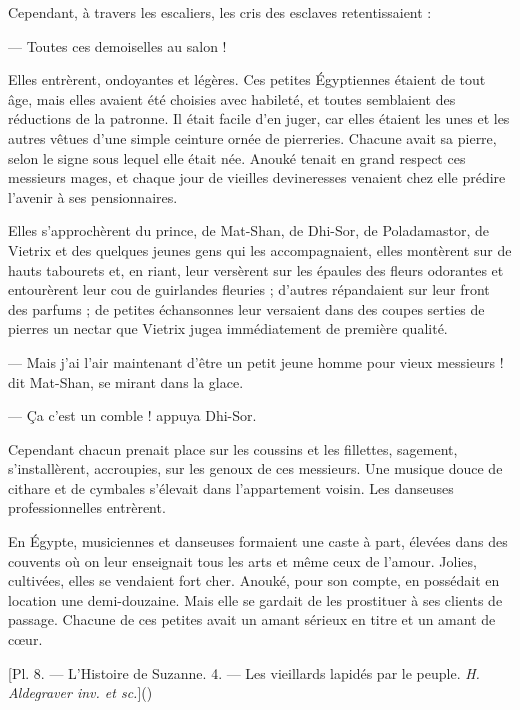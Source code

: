 \documentclass[a4paper, 11pt, oneside, polutonikogreek, french]{article}
\begin{document}
\bigskip
\centerline{\EightStarTaper}
\centerline{\EightStarTaper\EightStarTaper}
\bigskip

Cependant, à travers les escaliers, les cris des esclaves retentissaient :

--- Toutes ces demoiselles au salon !

Elles entrèrent, ondoyantes et légères. Ces petites Égyptiennes étaient de tout âge, mais elles avaient été choisies avec habileté, et toutes semblaient des réductions de la patronne. Il était facile d'en juger, car elles étaient les unes et les autres vêtues d'une simple ceinture ornée de pierreries. Chacune avait sa pierre, selon le signe sous lequel elle était née. Anouké tenait en grand respect ces messieurs mages, et chaque jour de vieilles devineresses venaient chez elle prédire l'avenir à ses pensionnaires.

Elles s'approchèrent du prince, de Mat-Shan, de Dhi-Sor, de Poladamastor, de Vietrix et des quelques jeunes gens qui les accompagnaient, elles montèrent sur de hauts tabourets et, en riant, leur versèrent sur les épaules des fleurs odorantes et entourèrent leur cou de guirlandes fleuries ; d'autres répandaient sur leur front des parfums ; de petites échansonnes leur versaient dans des coupes serties de pierres un nectar que Vietrix jugea immédiatement de première qualité.

--- Mais j'ai l'air maintenant d'être un petit jeune homme pour vieux messieurs ! dit Mat-Shan, se mirant dans la glace.

--- Ça c'est un comble ! appuya Dhi-Sor.

\bigskip
\centerline{\EightStarTaper}
\centerline{\EightStarTaper\EightStarTaper}
\bigskip

Cependant chacun prenait place sur les coussins et les fillettes, sagement, s'installèrent, accroupies, sur les genoux de ces messieurs. Une musique douce de cithare et de cymbales s'élevait dans l'appartement voisin. Les danseuses professionnelles entrèrent.

En Égypte, musiciennes et danseuses formaient une caste à part, élevées dans des couvents où on leur enseignait tous les arts et même ceux de l'amour. Jolies, cultivées, elles se vendaient fort cher. Anouké, pour son compte, en possédait en location une demi-douzaine. Mais elle se gardait de les prostituer à ses clients de passage. Chacune de ces petites avait un amant sérieux en titre et un amant de cœur.

[Pl. 8. --- L'Histoire de Suzanne. 4. --- Les vieillards lapidés par le peuple. \emph{H. Aldegraver inv. et sc.}]()
\end{document}
